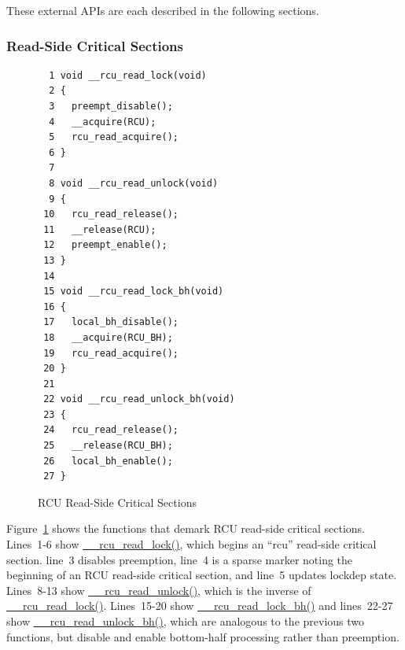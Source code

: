 These external APIs are each described in the following sections.

\subsubsection{Read-Side Critical Sections}
\label{app:rcuimpl:rcutreewt:Read-Side Critical Sections}

\begin{figure}[tbp]
{ \scriptsize
\begin{verbatim}
  1 void __rcu_read_lock(void)
  2 {
  3   preempt_disable();
  4   __acquire(RCU);
  5   rcu_read_acquire();
  6 }
  7 
  8 void __rcu_read_unlock(void)
  9 {
 10   rcu_read_release();
 11   __release(RCU);
 12   preempt_enable();
 13 }
 14 
 15 void __rcu_read_lock_bh(void)
 16 {
 17   local_bh_disable();
 18   __acquire(RCU_BH);
 19   rcu_read_acquire();
 20 }
 21 
 22 void __rcu_read_unlock_bh(void)
 23 {
 24   rcu_read_release();
 25   __release(RCU_BH);
 26   local_bh_enable();
 27 }
\end{verbatim}
}
\caption{RCU Read-Side Critical Sections}
\label{fig:app:rcuimpl:rcutreewt:RCU Read-Side Critical Sections}
\end{figure}

Figure~\ref{fig:app:rcuimpl:rcutreewt:RCU Read-Side Critical Sections}
shows the functions that demark RCU read-side critical sections.
Lines~1-6 show \url{__rcu_read_lock()}, which begins an ``rcu''
read-side critical section.
line~3 disables preemption,
line~4 is a sparse marker noting the beginning of an RCU read-side critical
section,
and 
line~5 updates lockdep state.
Lines~8-13 show \url{__rcu_read_unlock()}, which is the inverse of
\url{__rcu_read_lock()}.
Lines~15-20 show \url{__rcu_read_lock_bh()} and lines~22-27 show
\url{__rcu_read_unlock_bh()}, which are analogous to the previous
two functions, but disable and enable bottom-half processing rather
than preemption.

